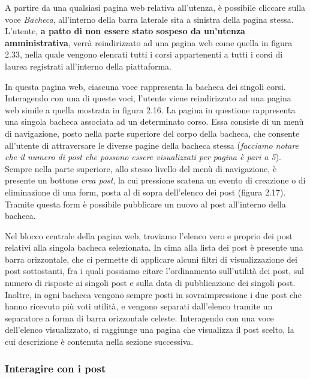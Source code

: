 \documentclass [a4paper,11pt]{book}
\begin{document}
A partire da una qualsiasi pagina web relativa all'utenza, è possibile cliccare sulla voce \emph{Bacheca}, all'interno della barra laterale sita a sinistra della pagina stessa. L'utente, \textbf{a patto di non essere stato sospeso da un'utenza amministrativa}, verrà reindirizzato ad una pagina web come quella in figura 2.33, nella quale vengono elencati tutti i corsi appartenenti a tutti i corsi di laurea registrati all'interno della piattaforma.


In questa pagina web, ciascuna voce rappresenta la bacheca dei singoli corsi. Interagendo con una di queste voci, l'utente viene reindirizzato ad una pagina web simile a quella mostrata in figura 2.16. La pagina in questione rappresenta una singola bacheca associata ad un determinato corso. Essa consiste di un menù di navigazione, posto nella parte superiore del corpo della bacheca, che consente all'utente di attraversare le diverse pagine della bacheca stessa (\emph{facciamo notare che il numero di post che possono essere visualizzati per pagina è pari a 5}). Sempre nella parte superiore, allo stesso livello del menù di navigazione, è presente un bottone \emph{crea post}, la cui pressione scatena un evento di creazione o di eliminazione di una form, posta al di sopra dell'elenco dei post (figura 2.17). Tramite questa form è possibile pubblicare un nuovo al post all'interno della bacheca.

Nel blocco centrale della pagina web, troviamo l'elenco vero e proprio dei post relativi alla singola bacheca selezionata. In cima alla lista dei post è presente una barra orizzontale, che ci permette di applicare alcuni filtri di visualizzazione dei post sottostanti, fra i quali possiamo citare l'ordinamento sull'utilità dei post, sul numero di risposte ai singoli post e sulla data di pubblicazione dei singoli post. Inoltre, in ogni bacheca vengono sempre posti in sovraimpressione i due post che hanno ricevuto più voti utilità, e vengono separati dall'elenco tramite un separatore a forma di barra orizzontale celeste. Interagendo con una voce dell'elenco visualizzato, si raggiunge una pagina che visualizza il post scelto, la cui descrizione è contenuta nella sezione successiva.

\medskip

\subsubsection{Interagire con i post}
\end{document}
